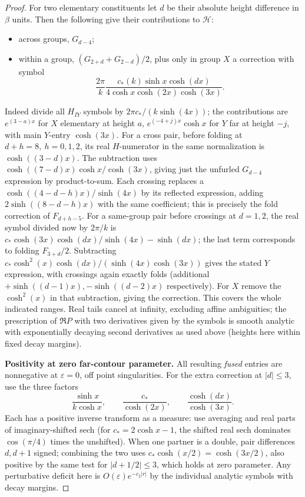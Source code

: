 \begin{proof}
For two elementary constituents let \(d\) be their absolute height difference in \(\beta\) units. Then the following give their contributions to \(\mathcal H\):
\begin{itemize}
\item across groups, \(G_{d-4}\);
\item within a group, \((G_{2+d}+G_{2-d})/2\), plus only in group \(X\) a correction with symbol
\[
 \frac{2\pi}{k}\frac{c_*(k)\sinh x\cosh(dx)}{4\cosh x\cosh(2x)\cosh(3x)} .
\]
\end{itemize}
Indeed divide all \(H_{IY}\) symbols by \(2\pi c_*/(k\sinh(4x))\); the contributions are \(e^{(3-a)x}\) for \(X\) elementary at height \(a\), \(e^{(-4+j)x}\cosh x\) for \(Y\) far at height \(-j\), with main \(Y\)-entry \(\cosh(3x)\). For a cross pair, before folding at \(d+h=8,\ h=0,1,2\), its real \(H\)-numerator in the same normalization is \(\cosh((3-d)x)\). The subtraction uses \(\cosh((7-d)x)\cosh x/\cosh(3x)\), giving just the unfurled \(G_{d-4}\) expression by product-to-sum. Each crossing replaces a \(\cosh((4-d-h)x)/\sinh(4x)\) by its reflected expression, adding \(2\sinh((8-d-h)x)\) with the same coefficient; this is precisely the fold correction of \(F_{d+h-5}\). For a same-group pair before crossings at \(d=1,2\), the real symbol divided now by \(2\pi/k\) is \(c_* \cosh(3x)\cosh(dx)/\sinh(4x)-\sinh(dx)\); the last term corresponds to folding \(F_{3+d}/2\). Subtracting \(c_* \cosh^2(x)\cosh(dx)/(\sinh(4x)\cosh(3x))\) gives the stated \(Y\) expression, with crossings again exactly folds (additional \(+\sinh((d-1)x),-\sinh((d-2)x)\) respectively). For \(X\) remove the \(\cosh^2(x)\) in that subtraction, giving the correction. This covers the whole indicated ranges. Real tails cancel at infinity, excluding affine ambiguities; the prescription of \(\Re P\) with two derivatives given by the symbols is smooth analytic with exponentially decaying second derivatives as used above (heights here within fixed decay margins).

\par\smallskip\noindent\textbf{Positivity at zero far-contour parameter.}
All resulting \emph{fused} entries are nonnegative at \(\varepsilon=0\), off point singularities. For the extra correction at $|d|\le3$, use the three factors
\[
 \frac{\sinh x}{k\cosh x},\qquad
 \frac{c_*}{\cosh(2x)},\qquad
 \frac{\cosh(dx)}{\cosh(3x)}.
\]
Each has a positive inverse transform as a measure: use averaging and real parts of imaginary-shifted sech (for \(c_*=2\cosh x-1\), the shifted real sech dominates \(\cos(\pi/4)\) times the unshifted). When one partner is a double, pair differences \(d,d+1\) signed; combining the two uses \(c_*\cosh(x/2)=\cosh(3x/2)\), also positive by the same test for \(|d+1/2|\le3\), which holds at zero parameter. Any perturbative deficit here is \(O(\varepsilon)e^{-c_2|r|}\) by the individual analytic symbols with decay margins.


\end{proof}
